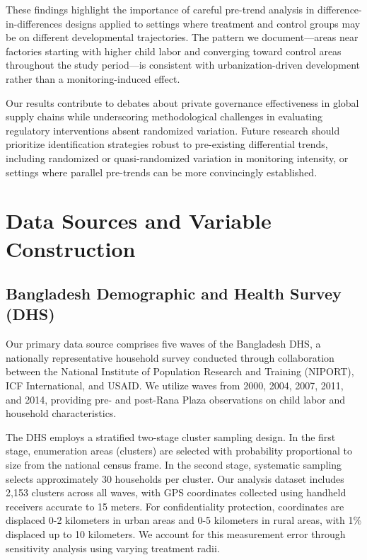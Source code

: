 \documentclass[12pt]{article}
\begin{document}
These findings highlight the importance of careful pre-trend analysis in difference-in-differences designs applied to settings where treatment and control groups may be on different developmental trajectories. The pattern we document---areas near factories starting with higher child labor and converging toward control areas throughout the study period---is consistent with urbanization-driven development rather than a monitoring-induced effect.

Our results contribute to debates about private governance effectiveness in global supply chains while underscoring methodological challenges in evaluating regulatory interventions absent randomized variation. Future research should prioritize identification strategies robust to pre-existing differential trends, including randomized or quasi-randomized variation in monitoring intensity, or settings where parallel pre-trends can be more convincingly established.

\clearpage




\appendix

\section{Data Sources and Variable Construction}

\subsection{Bangladesh Demographic and Health Survey (DHS)}

Our primary data source comprises five waves of the Bangladesh DHS, a nationally representative household survey conducted through collaboration between the National Institute of Population Research and Training (NIPORT), ICF International, and USAID. We utilize waves from 2000, 2004, 2007, 2011, and 2014, providing pre- and post-Rana Plaza observations on child labor and household characteristics.

The DHS employs a stratified two-stage cluster sampling design. In the first stage, enumeration areas (clusters) are selected with probability proportional to size from the national census frame. In the second stage, systematic sampling selects approximately 30 households per cluster. Our analysis dataset includes 2,153 clusters across all waves, with GPS coordinates collected using handheld receivers accurate to 15 meters. For confidentiality protection, coordinates are displaced 0-2 kilometers in urban areas and 0-5 kilometers in rural areas, with 1\% displaced up to 10 kilometers. We account for this measurement error through sensitivity analysis using varying treatment radii.
\end{document}
